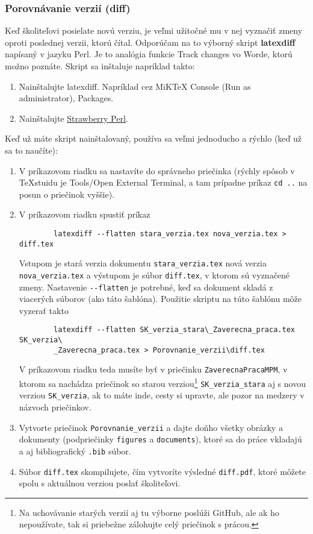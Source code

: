 \subsubsection{Porovnávanie verzií (diff)}
Keď školiteľovi posielate novú verziu, je veľmi užitočné mu v nej vyznačiť zmeny oproti poslednej verzii, ktorú čítal. Odporúčam na to výborný skript \textbf{latexdiff} napísaný v jazyku Perl. Je to analógia funkcie Track changes vo Worde, ktorú možno poznáte. Skript sa inštaluje napríklad takto:
\begin{enumerate}
	\item Nainštalujte latexdiff. Napríklad cez MiKTeX Console (Run as administrator), Packages.
	\item Nainštalujte \href{https://strawberryperl.com/}{Strawberry Perl}.
\end{enumerate}
Keď už máte skript nainštalovaný, používa sa veľmi jednoducho a rýchlo (keď už sa to naučíte):
\begin{enumerate}
	\item V príkazovom riadku sa nastavíte do správneho priečinka (rýchly spôsob v TeXstuidu je Tools/Open External Terminal, a tam prípadne príkaz \verb|cd ..| na posun o priečinok vyššie).
	\item V príkazovom riadku spustiť príkaz
	\begin{verbatim}
		latexdiff --flatten stara_verzia.tex nova_verzia.tex > diff.tex
	\end{verbatim}
	Vstupom je stará verzia dokumentu \verb|stara_verzia.tex| nová verzia \verb|nova_verzia.tex| a výstupom je súbor \verb|diff.tex|, v ktorom sú vyznačené zmeny. Nastavenie \verb|--flatten| je potrebné, keď sa dokument skladá z viacerých súborov (ako táto šablóna). Použitie skriptu na túto šablónu môže vyzerať takto
	\begin{verbatim}
		latexdiff --flatten SK_verzia_stara\_Zaverecna_praca.tex SK_verzia\
		_Zaverecna_praca.tex > Porovnanie_verzii\diff.tex
	\end{verbatim}
	V príkazovom riadku teda musíte byť v priečinku \verb|ZaverecnaPracaMPM|, v ktorom sa nachádza priečinok so starou verziou\footnote{Na uchovávanie starých verzií aj tu výborne poslúži GitHub, ale ak ho nepoužívate, tak si priebežne zálohujte celý priečinok s prácou.} \verb|SK_verzia_stara| aj s novou verziou \verb|SK_verzia|, ak to máte inde, cesty si upravte, ale pozor na medzery v názvoch priečinkov.
	\item Vytvorte priečinok \verb|Porovnanie_verzii| a dajte doňho všetky obrázky a dokumenty (podpriečinky \verb|figures| a \verb|documents|), ktoré sa do práce vkladajú a aj bibliografický \verb|.bib| súbor.
	\item Súbor \verb|diff.tex| skompilujete, čím vytvoríte výsledné \verb|diff.pdf|, ktoré môžete spolu s aktuálnou verziou poslať školiteľovi.
\end{enumerate}








